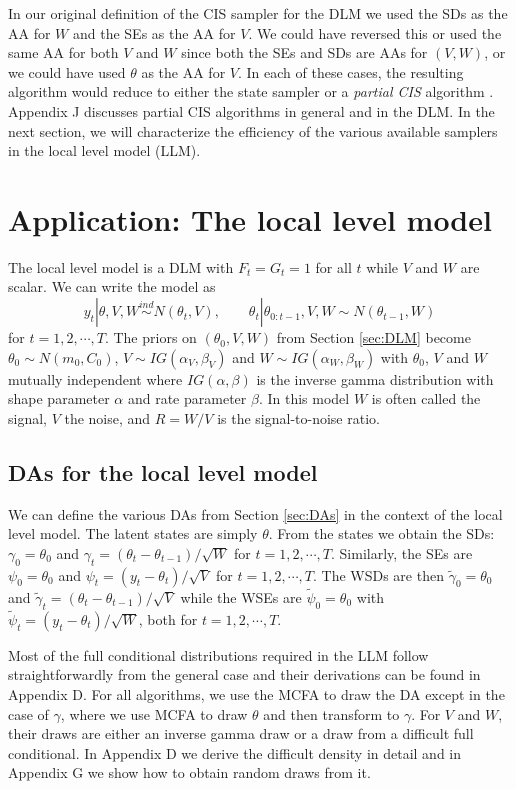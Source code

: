 \documentclass[12pt]{article}
\begin{document}
In our original definition of the CIS sampler for the DLM we used the SDs as the AA for $W$ and the SEs as the AA for $V$. We could have reversed this or used the same AA for both $V$ and $W$ since both the SEs and SDs are AAs for $(V,W)$, or we could have used $\theta$ as the AA for $V$. In each of these cases, the resulting algorithm would reduce to either the state sampler or a {\it partial CIS} algorithm \citep{yu2011center}. Appendix J discusses partial CIS algorithms in general and in the DLM. In the next section, we will characterize the efficiency of the various available samplers in the local level model (LLM).

\section{Application: The local level model}\label{sec:LLM}

The local level model is a DLM with $F_t=G_t=1$ for all $t$ while $V$ and $W$ are scalar. We can write the model as \vspace{-.3cm}
\[
  y_t |\theta,V,W \stackrel{ind}{\sim} N(\theta_t,V), \qquad
  \theta_t |\theta_{0:t-1},V,W \sim N(\theta_{t-1},W)
\]
for $t=1,2,\cdots,T$. The priors on $(\theta_0,V,W)$ from Section \ref{sec:DLM} become $\theta_0\sim N(m_0,C_0)$, $V\sim IG(\alpha_V,\beta_V)$ and $W\sim IG(\alpha_W,\beta_W)$ with $\theta_0$, $V$ and $W$ mutually independent where $IG(\alpha,\beta)$ is the inverse gamma distribution with shape parameter $\alpha$ and rate parameter $\beta$. In this model $W$ is often called the signal, $V$ the noise, and $R=W/V$ is the signal-to-noise ratio.

\subsection{DAs for the local level model}

We can define the various DAs from Section \ref{sec:DAs} in the context of the local level model. The latent states are simply $\theta$. From the states we obtain the SDs: $\gamma_0=\theta_0$ and $\gamma_t = (\theta_t - \theta_{t-1})/\sqrt{W}$ for $t=1,2,\cdots,T$. Similarly, the SEs are $\psi_0=\theta_0$ and $\psi_t = (y_t - \theta_t)/\sqrt{V}$ for $t=1,2,\cdots,T$. The WSDs are then $\tilde{\gamma}_{0}=\theta_0$ and $\tilde{\gamma}_t = (\theta_t - \theta_{t-1})/\sqrt{V}$ while the WSEs are $\tilde{\psi}_0=\theta_0$ with $\tilde{\psi}_t = (y_t - \theta_t)/\sqrt{W}$, both for $t=1,2,\cdots,T$. 

Most of the full conditional distributions required in the LLM follow straightforwardly from the general case and their derivations can be found in Appendix D. For all algorithms, we use the MCFA to draw the DA except in the case of $\gamma$, where we use MCFA to draw $\theta$ and then transform to $\gamma$. For $V$ and $W$, their draws are either an inverse gamma draw or a draw from a difficult full conditional. In Appendix D we derive the difficult density in detail and in Appendix G we show how to obtain random draws from it.
\end{document}
